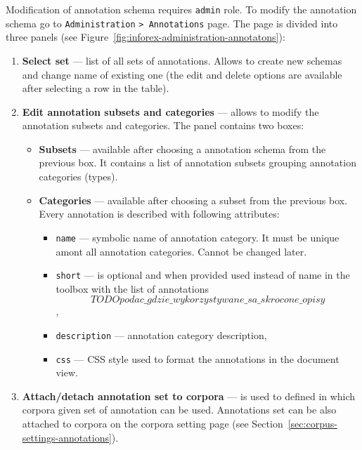\documentclass[a4paper,10pt,oneside]{scrbook}
\begin{document}
  Modification of annotation schema requires \verb|admin| role. To modify the annotation schema go to \verb|Administration| \verb|> Annotations| page. The page is divided into three panels (see Figure~\ref{fig:inforex-administration-annotatons}):
\begin{enumerate}
 \item \textbf{Select set} --- list of all sets of annotations. Allows to create new schemas and change name of existing one (the edit and delete options are available after selecting a row in the table).
 
 \item \textbf{Edit annotation subsets and categories} --- allows to modify the annotation subsets and categories. The panel contains two boxes:

 \begin{itemize}
    \item \textbf{Subsets} --- available after choosing a annotation schema from the previous box. It contains a list of annotation subsets grouping annotation categories (types).
    
    \item \textbf{Categories} --- available after choosing a subset from the previous box.
    Every annotation is described with following attributes:
    \begin{itemize}
      \item \verb|name| --- symbolic name of annotation category. It must be unique amont all annotation categories. Cannot be changed later.
      \item \verb|short| --- is optional and when provided used instead of name in the toolbox with the list of annotations {\[TODO podac\_gdzie\_wykorzystywane\_sa\_skrocone\_opisy\]},
      \item \verb|description| --- annotation category description,
      \item \verb|css| --- CSS style used to format the annotations in the document view.
    \end{itemize}
    
 \end{itemize}

  \item \textbf{Attach/detach annotation set to corpora} --- is used to defined in which corpora given set of annotation can be used. Annotations set can be also attached to corpora on the corpora setting page (see Section~\ref{sec:corpus-settings-annotations}).
 
 \end{enumerate}
\end{document}
